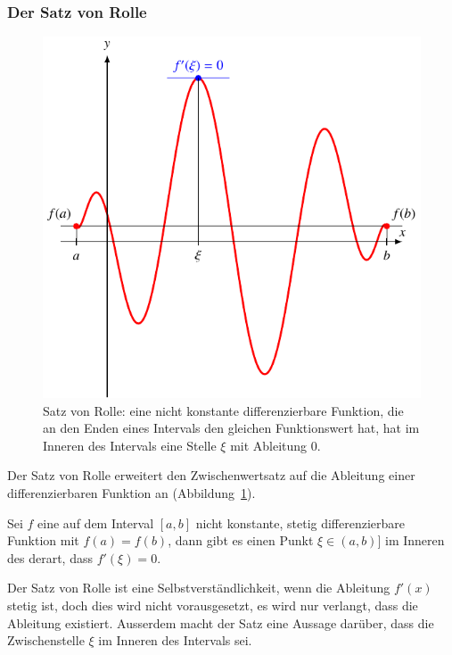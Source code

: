 \subsubsection{Der Satz von Rolle}
\begin{figure}
\centering
\includegraphics{chapters/30-interpolation/figures/rolle.pdf}
\caption{Satz von Rolle: eine nicht konstante differenzierbare Funktion,
die an den Enden eines Intervals den gleichen Funktionswert hat, hat im 
Inneren des Intervals eine Stelle $\xi$ mit Ableitung $0$.
\label{buch:figure:rolle}}
\end{figure}
Der Satz von Rolle erweitert den Zwischenwertsatz auf die Ableitung einer
differenzierbaren Funktion an (Abbildung~\ref{buch:figure:rolle}).

\begin{satz}[Rolle]
\label{buch:satz:rolle}
Sei $f$ eine auf dem Interval $[a,b]$ nicht konstante,
stetig differenzierbare Funktion
mit $f(a)=f(b)$, dann gibt es einen Punkt $\xi\in(a,b)]$ im Inneren
des derart, dass $f'(\xi)=0$.
\end{satz}

Der Satz von Rolle ist eine Selbstverständlichkeit, wenn die Ableitung
$f'(x)$ stetig ist, doch dies wird nicht vorausgesetzt, es wird nur
verlangt, dass die Ableitung existiert.
Ausserdem macht der Satz eine Aussage darüber, dass die Zwischenstelle
$\xi$ im Inneren des Intervals sei.

